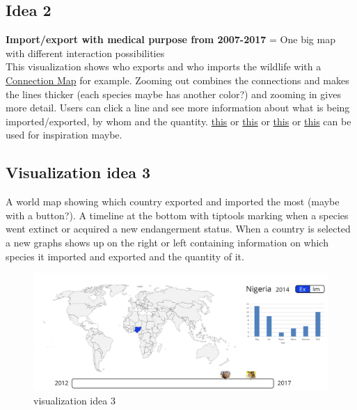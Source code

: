 \subsection{Idea 2 }
\textbf{Import/export with medical purpose from 2007-2017} = One big map with different interaction possibilities\\

This visualization shows who exports and who imports the wildlife with a \href{https://datavizcatalogue.com/methods/connection_map.html}{Connection Map} for example. Zooming out combines the connections and makes the lines thicker (each species maybe has another color?) and zooming in gives more detail. Users can click a line and see more information about what is being imported/exported, by whom and the quantity.  \href{https://i.pinimg.com/736x/1b/b8/27/1bb82777d0aca7ce9abd08441e06781e.jpg}{this} or \href{http://metrocosm.com/animated-immigration-map/}{this} or \href{https://www.mapd.com/demos/tweetmap/}{this} or \href{https://ecoregions2017.appspot.com/}{this} can be used for inspiration maybe.


\subsection{Visualization idea 3}
A world map showing which country exported and imported the most (maybe with a button?). A timeline at the bottom with tiptools marking when a species went extinct or acquired a new endangerment status. When a country is selected a new graphs shows up on the right or left containing information on which species it imported and exported and the quantity of it.

\begin{figure} [h] \label{visid2}
\includegraphics[width=12cm]{images/idea-infovis.png}
\caption{visualization idea 3}
\end{figure}

\fi %






